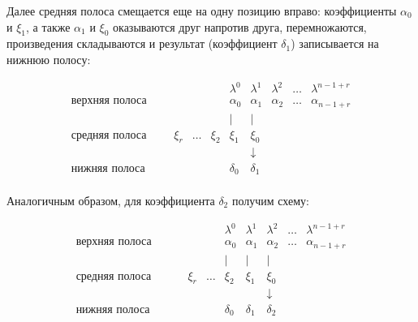 Далее средняя полоса смещается еще на одну позицию вправо: коэффициенты $\alpha_0$ и $\xi_1$, а также $\alpha_1$ и $\xi_0$
оказываются друг напротив друга, перемножаются, произведения складываются и результат (коэффициент $\delta_1$) записывается на нижнюю полосу:

	$$
		\begin{array}{ccccccccccc}
			                      &       &       &       &       &       & \lambda^0 & \lambda^1  & \lambda^2 & \dots & \lambda^{n-1+r} \\
			\hline
			\text{верхняя полоса} &       &       &       &       &       & \alpha_0  & \alpha_1   & \alpha_2  & \dots & \alpha_{n-1+r} \\
			                      &       &       &       &       &       & |         & |          &           &       & \\
			\text{средняя полоса} &       &       & \xi_r & \dots & \xi_2 & \xi_1     & \xi_0      &           &       & \\
			                      &       &       &       &       &       &           & \downarrow &           &       & \\
			\text{нижняя полоса}  &       &       &       &       &       & \delta_0  & \delta_1   &           &       & \\
		\end{array}
	$$

Аналогичным образом, для коэффициента $\delta_2$ получим схему:

	$$
		\begin{array}{ccccccccccc}
			                      &       &       &       &       &       & \lambda^0 & \lambda^1  & \lambda^2  & \dots & \lambda^{n-1+r} \\
			\hline
			\text{верхняя полоса} &       &       &       &       &       & \alpha_0  & \alpha_1   & \alpha_2   & \dots & \alpha_{n-1+r} \\
			                      &       &       &       &       &       & |         & |          & |          &       & \\
			\text{средняя полоса} &       &       &       & \xi_r & \dots & \xi_2     & \xi_1      & \xi_0      &       & \\
			                      &       &       &       &       &       &           &            & \downarrow &       & \\
			\text{нижняя полоса}  &       &       &       &       &       & \delta_0  & \delta_1   & \delta_2   &       & \\
		\end{array}
	$$

